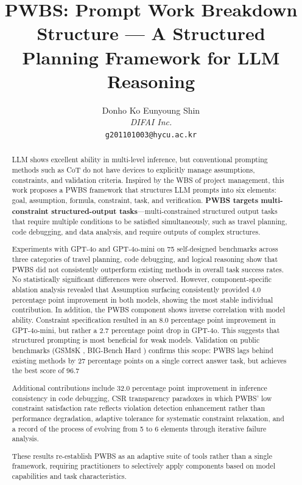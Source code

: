 \documentclass[11pt,a4paper]{article}
\title{\textbf{PWBS: Prompt Work Breakdown Structure --- A Structured Planning Framework for LLM Reasoning}}
\author{
  Donho Ko \quad Eunyoung Shin \\[6pt]
  \textit{DIFAI Inc.} \\[4pt]
  \texttt{g201101003@hycu.ac.kr}
}
\date{}
\begin{document}
\maketitle

\begin{abstract}
LLM shows excellent ability in multi-level inference, but conventional prompting methods such as CoT do not have devices to explicitly manage assumptions, constraints, and validation criteria. Inspired by the WBS of project management, this work proposes a PWBS framework that structures LLM prompts into six elements: goal, assumption, formula, constraint, task, and verification. \textbf{PWBS targets multi-constraint structured-output tasks}---multi-constrained structured output tasks that require multiple conditions to be satisfied simultaneously, such as travel planning, code debugging, and data analysis, and require outputs of complex structures.

Experiments with GPT-4o and GPT-4o-mini on 75 self-designed benchmarks across three categories of travel planning, code debugging, and logical reasoning show that PWBS did not consistently outperform existing methods in overall task success rates. No statistically significant differences were observed. However, component-specific ablation analysis revealed that Assumption surfacing consistently provided 4.0 percentage point improvement in both models, showing the most stable individual contribution. In addition, the PWBS component shows inverse correlation with model ability. Constraint specification resulted in an 8.0 percentage point improvement in GPT-4o-mini, but rather a 2.7 percentage point drop in GPT-4o. This suggests that structured prompting is most beneficial for weak models. Validation on public benchmarks (GSM8K \citep{cobbe2021gsm8k}, BIG-Bench Hard \citep{suzgun2023challenging}) confirms this scope: PWBS lags behind existing methods by 27 percentage points on a single correct answer task, but achieves the best score of 96.7%

Additional contributions include 32.0 percentage point improvement in inference consistency in code debugging, CSR transparency paradoxes in which PWBS' low constraint satisfaction rate reflects violation detection enhancement rather than performance degradation, adaptive tolerance for systematic constraint relaxation, and a record of the process of evolving from 5 to 6 elements through iterative failure analysis.

These results re-establish PWBS as an adaptive suite of tools rather than a single framework, requiring practitioners to selectively apply components based on model capabilities and task characteristics.
\end{abstract}
\end{document}
